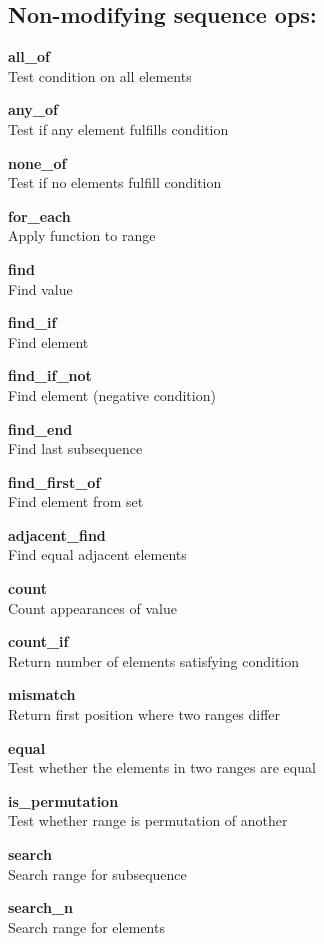 \documentclass[table]{article}
\begin{document}
	
	\pagebreak
	\normalsize
	\begin{multicols}{2}
	\subsection*{Non-modifying sequence ops:}
	
	\textbf{all\_of}\\
	Test condition on all elements
	
	\textbf{any\_of}\\
	Test if any element fulfills condition
	
	\textbf{none\_of}\\
	Test if no elements fulfill condition
	
	\textbf{for\_each}\\
	Apply function to range
	
	\textbf{find}\\
	Find value
	
	\textbf{find\_if}\\
	Find element
	
	\textbf{find\_if\_not}\\
	Find element (negative condition)
	
	\textbf{find\_end}\\
	Find last subsequence
	
	\textbf{find\_first\_of}\\
	Find element from set
	
	\textbf{adjacent\_find}\\
	Find equal adjacent elements
	
	\textbf{count}\\
	Count appearances of value
	
	\textbf{count\_if}\\
	Return number of elements satisfying condition
	
	\textbf{mismatch}\\
	Return first position where two ranges differ
	
	\textbf{equal}\\
	Test whether the elements in two ranges are equal
	
	\textbf{is\_permutation}\\
	Test whether range is permutation of another
	
	\textbf{search}\\
	Search range for subsequence
	
	\textbf{search\_n}\\
	Search range for elements
	

\end{multicols}
\end{document}
